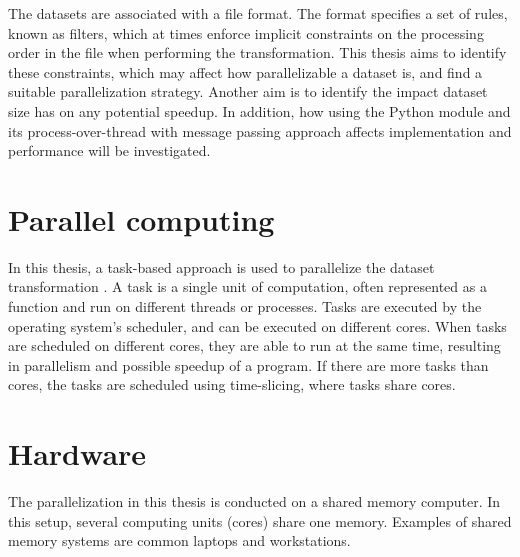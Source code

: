 The datasets are associated with a file format. The format specifies a set of rules, known as filters, which at times enforce
implicit constraints on the processing order in the file when performing the transformation. This thesis aims to identify these
constraints, which may affect how parallelizable a dataset is, and find a suitable parallelization strategy. Another aim is to identify the impact dataset size has on
any potential speedup. In addition, how using the Python  module and its process-over-thread with message passing
approach affects implementation and performance will be investigated.

\section{Parallel computing}
In this thesis, a task-based approach is used to parallelize the dataset transformation \cite{chow_2015_pipeline_ppiaote}. A task is a single unit of computation, often represented as a function
and run on different threads or processes. Tasks are executed by the operating system's scheduler, and can be executed on different cores. When tasks are scheduled
on different cores, they are able to run at the same time, resulting in parallelism and possible speedup of a program. If there are more tasks than cores, the tasks
are scheduled using time-slicing, where tasks share cores.

\section{Hardware}
The parallelization in this thesis is conducted on a shared memory computer. In this setup, several computing units (cores) share one memory. Examples of
shared memory systems are common laptops and workstations.


